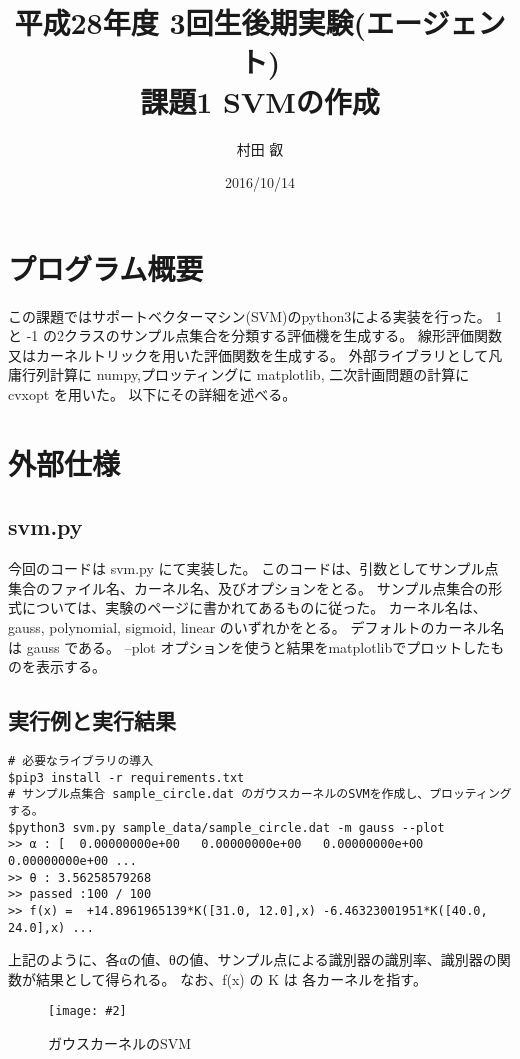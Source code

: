 \documentclass[]{jsarticle}
\newcommand*{\graphc}[3][7.0cm]{\begin{figure}[h] \begin{center}\texttt{[image: \#2]}\caption{#3}\end{center}\end{figure}}
\begin{document}
\title{平成28年度 3回生後期実験(エージェント) \\ 課題1 SVMの作成 }
\author{村田 叡}
\date{ 2016/10/14 }
\maketitle

\section{プログラム概要}
この課題ではサポートベクターマシン(SVM)のpython3による実装を行った。
1 と -1 の2クラスのサンプル点集合を分類する評価機を生成する。
線形評価関数又はカーネルトリックを用いた評価関数を生成する。
外部ライブラリとして凡庸行列計算に numpy,プロッティングに matplotlib,
二次計画問題の計算に cvxopt を用いた。
以下にその詳細を述べる。


\section{外部仕様}

\subsection{svm.py}
今回のコードは svm.py にて実装した。
このコードは、引数としてサンプル点集合のファイル名、カーネル名、及びオプションをとる。
サンプル点集合の形式については、実験のページに書かれてあるものに従った。
カーネル名は、gauss, polynomial, sigmoid, linear のいずれかをとる。
デフォルトのカーネル名は gauss である。
--plot オプションを使うと結果をmatplotlibでプロットしたものを表示する。

\subsection{実行例と実行結果}
\begin{verbatim}
# 必要なライブラリの導入
$pip3 install -r requirements.txt
# サンプル点集合 sample_circle.dat のガウスカーネルのSVMを作成し、プロッティングする。
$python3 svm.py sample_data/sample_circle.dat -m gauss --plot
>> α : [  0.00000000e+00   0.00000000e+00   0.00000000e+00   0.00000000e+00 ...
>> θ : 3.56258579268
>> passed :100 / 100
>> f(x) =  +14.8961965139*K([31.0, 12.0],x) -6.46323001951*K([40.0, 24.0],x) ...
\end{verbatim}
上記のように、各αの値、θの値、サンプル点による識別器の識別率、識別器の関数が結果として得られる。
なお、f(x) の K は 各カーネルを指す。
\graphc[16cm]{./images/circleplot.png}{ガウスカーネルのSVM}
\end{document}
